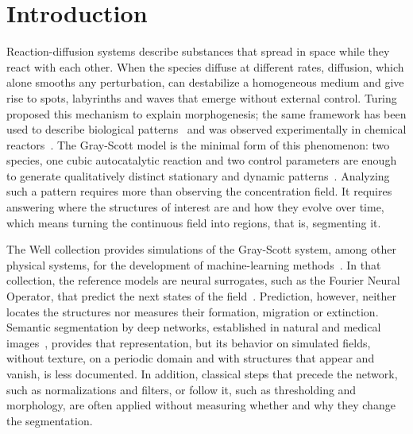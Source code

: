 \documentclass[final,5p,times,twocolumn]{elsarticle}
\begin{document}
\setcounter{tocdepth}{2}
\tableofcontents
\vspace{1em}

\section{Introduction}\label{sec:intro}

Reaction-diffusion systems describe substances that spread in space while they react with each other. When the species diffuse at different rates, diffusion, which alone smooths any perturbation, can destabilize a homogeneous medium and give rise to spots, labyrinths and waves that emerge without external control. Turing~\cite{turing1952} proposed this mechanism to explain morphogenesis; the same framework has been used to describe biological patterns~\cite{kondo2010,murray2003} and was observed experimentally in chemical reactors~\cite{lee1993}. The Gray-Scott model is the minimal form of this phenomenon: two species, one cubic autocatalytic reaction and two control parameters are enough to generate qualitatively distinct stationary and dynamic patterns~\cite{gray1983,pearson1993}. Analyzing such a pattern requires more than observing the concentration field. It requires answering where the structures of interest are and how they evolve over time, which means turning the continuous field into regions, that is, segmenting it.

The Well collection provides simulations of the Gray-Scott system, among other physical systems, for the development of machine-learning methods~\cite{ohana2024well}. In that collection, the reference models are neural surrogates, such as the Fourier Neural Operator, that predict the next states of the field~\cite{li2021fno,brunton2020}. Prediction, however, neither locates the structures nor measures their formation, migration or extinction. Semantic segmentation by deep networks, established in natural and medical images~\cite{long2015fcn,ronneberger2015unet,xie2021segformer,cheng2022mask2former}, provides that representation, but its behavior on simulated fields, without texture, on a periodic domain and with structures that appear and vanish, is less documented. In addition, classical steps that precede the network, such as normalizations and filters, or follow it, such as thresholding and morphology, are often applied without measuring whether and why they change the segmentation.
\end{document}
